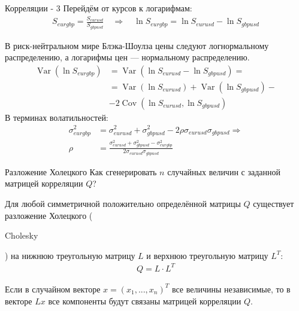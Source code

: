 \documentclass{beamer}
\newcommand{\en}[1]{\begin{otherlanguage}{english}#1\end{otherlanguage}}
\begin{document}
\newcommand{\Var}{\operatorname{Var}}
\newcommand{\Cov}{\operatorname{Cov}}

\begin{frame}{Корреляции - 3}
\justify
Перейдём от курсов к логарифмам:
\begin{align*}
S_{eurgbp} = \frac{S_{eurusd}}{S_{gbpusd}} \quad \Rightarrow \quad \ln S_{eurgbp} = \ln S_{eurusd} - \ln S_{gbpusd} 
\end{align*}

\justify
В риск-нейтральном мире Блэка-Шоулза цены следуют логнормальному распределению, а логарифмы цен --- нормальному распределению.
\begin{align*}
\Var(\ln S_{eurgbp}) &= \Var(\ln S_{eurusd} - \ln S_{gbpusd}) = \\
&= \Var(\ln S_{eurusd}) + \Var(\ln S_{gbpusd}) - \\
&- 2\Cov(\ln S_{eurusd}, \ln S_{gbpusd})
\end{align*}
В терминах волатильностей:
\begin{align*}
\sigma_{eurgbp}^2 &= \sigma_{eurusd}^2 + \sigma_{gbpusd}^2 - 2\rho\sigma_{eurusd}\sigma_{gbpusd} \Rightarrow \\
\rho &= \frac{\sigma_{eurusd}^2 + \sigma_{gbpusd}^2 - \sigma_{eurgbp}^2}{2\sigma_{eurusd}\sigma_{gbpusd}}
\end{align*}
\end{frame}



\begin{frame}{Разложение Холецкого}
\justify
Как сгенерировать $n$ случайных величин с заданной матрицей корреляции $Q$?

\justify
Для любой симметричной положительно определённой матрицы $Q$ существует разложение Холецкого (\en{Cholesky}) на нижнюю треугольную матрицу $L$ и верхнюю треугольную матрицу $L^T$:
\begin{align*}
Q = L \cdot L^T
\end{align*}

\justify
Если в случайном векторе $x=(x_1,...,x_n)^T$ все величины независимые, то в векторе $Lx$ все компоненты будут связаны матрицей корреляции $Q$.
\end{frame}
\end{document}
